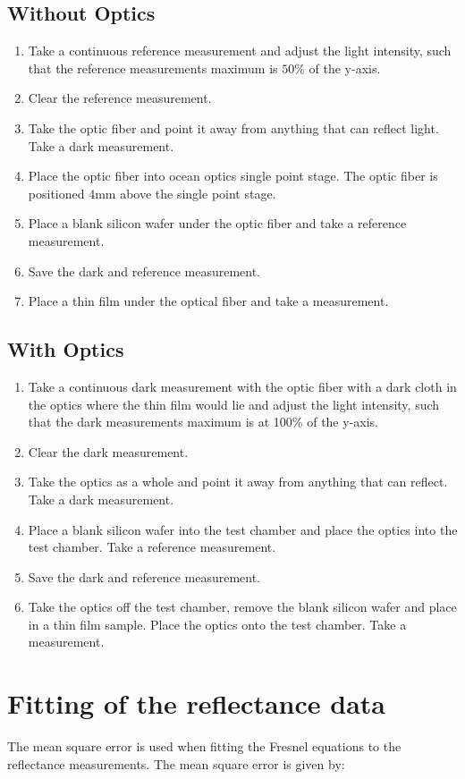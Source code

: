 \documentclass[MasterThesisMain.tex]{subfiles}
\begin{document}
\subsection{Without Optics}
\begin{enumerate}
\item Take a continuous reference measurement and adjust the light intensity, such that the reference measurements maximum is $50\%$ of the y-axis.
\item Clear the reference measurement.
\item Take the optic fiber and point it away from anything that can reflect light. Take a dark measurement.
\item Place the optic fiber into ocean optics single point stage. The optic fiber is positioned $4$mm above the single point stage.
\item Place a blank silicon wafer under the optic fiber and take a reference measurement.
\item Save the dark and reference measurement.
\item Place a thin film under the optical fiber and take a measurement.  
\end{enumerate}

\subsection{With Optics}
\begin{enumerate}
\item Take a continuous dark measurement with the optic fiber with a dark cloth in the optics where the thin film would lie and adjust the light intensity, such that the dark measurements maximum is at 100$\%$ of the y-axis.
\item Clear the dark measurement.
\item Take the optics as a whole and point it away from anything that can reflect. Take a dark measurement.
\item Place a blank silicon wafer into the test chamber and place the optics into the test chamber. Take a reference measurement.
\item Save the dark and reference measurement.
\item Take the optics off the test chamber, remove the blank silicon wafer and place in a thin film sample. Place the optics onto the test chamber. Take a measurement.
\end{enumerate}

\section{Fitting of the reflectance data}
The mean square error is used when fitting the Fresnel equations to the reflectance measurements. The mean square error is given by:
\end{document}
